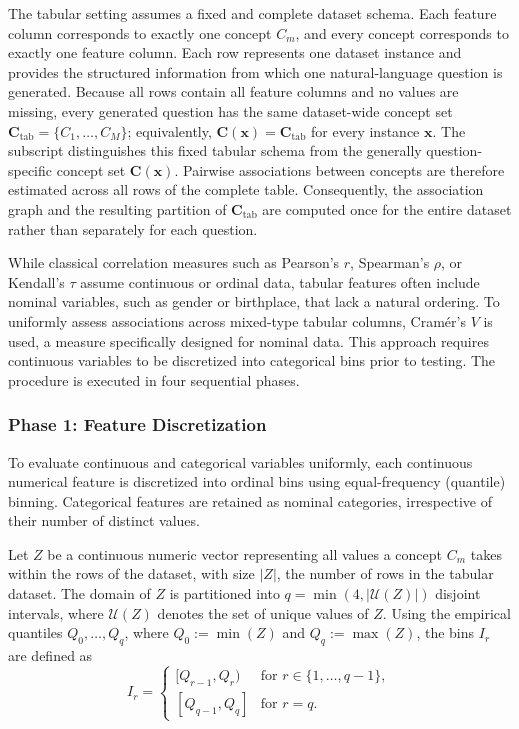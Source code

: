 The tabular setting assumes a fixed and complete dataset schema. Each feature column corresponds to exactly one concept $C_m$, and every concept corresponds to exactly one feature column. Each row represents one dataset instance and provides the structured information from which one natural-language question is generated. Because all rows contain all feature columns and no values are missing, every generated question has the same dataset-wide concept set $\mathbf{C}_{\mathrm{tab}}=\{C_1,\ldots,C_M\}$; equivalently, $\mathbf{C}(\mathbf{x})=\mathbf{C}_{\mathrm{tab}}$ for every instance $\mathbf{x}$. The subscript distinguishes this fixed tabular schema from the generally question-specific concept set $\mathbf{C}(\mathbf{x})$. Pairwise associations between concepts are therefore estimated across all rows of the complete table. Consequently, the association graph and the resulting partition of $\mathbf{C}_{\mathrm{tab}}$ are computed once for the entire dataset rather than separately for each question.

While classical correlation measures such as Pearson's $r$, Spearman's $\rho$, or Kendall's $\tau$ \cite{fieldDiscoveringStatisticsUsing2017} assume continuous or ordinal data, tabular features often include nominal variables, such as gender or birthplace, that lack a natural ordering. To uniformly assess associations across mixed-type tabular columns, Cramér's $V$ \cite[p.~282]{cramer1946mathematical} is used, a measure specifically designed for nominal data. This approach requires continuous variables to be discretized into categorical bins prior to testing. The procedure is executed in four sequential phases.

\subsubsection{Phase 1: Feature Discretization}

To evaluate continuous and categorical variables uniformly, each continuous numerical feature is discretized into ordinal bins using equal-frequency (quantile) binning. Categorical features are retained as nominal categories, irrespective of their number of distinct values.

Let $Z$ be a continuous numeric vector representing all values a concept $C_m$ takes within the rows of the dataset, with size $|Z|$, the number of rows in the tabular dataset. The domain of $Z$ is partitioned into $q = \min(4, |\mathcal{U}(Z)|)$ disjoint intervals, where $\mathcal{U}(Z)$ denotes the set of unique values of $Z$. Using the empirical quantiles $Q_0, \dots, Q_q$, where $Q_0 := \min(Z)$ and $Q_q := \max(Z)$, the bins $I_r$ are defined as
\begin{equation}
I_r =
\begin{cases}
[Q_{r-1}, Q_r) & \text{for } r \in \{1, \dots, q-1\}, \\[2pt]
[Q_{q-1}, Q_q] & \text{for } r = q.
\end{cases}
\end{equation}

